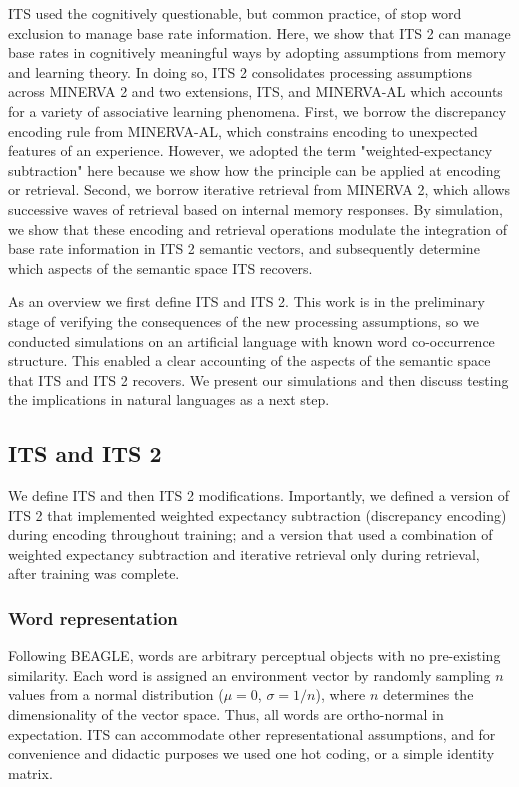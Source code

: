 \documentclass[10pt,letterpaper]{article}
\begin{document}
ITS used the cognitively questionable, but common practice, of stop word exclusion to manage base rate information. Here, we show that ITS 2 can manage base rates in cognitively meaningful ways by adopting assumptions from memory and learning theory. In doing so, ITS 2 consolidates processing assumptions across MINERVA 2 and two extensions, ITS, and MINERVA-AL \cite{jamiesonInstanceTheoryAssociative2012} which accounts for a variety of associative learning phenomena. First, we borrow the discrepancy encoding rule from MINERVA-AL, which constrains encoding to unexpected features of an experience. However, we adopted the term "weighted-expectancy subtraction" here because we show how the principle can be applied at encoding or retrieval. Second, we borrow iterative retrieval from MINERVA 2, which allows successive waves of retrieval based on internal memory responses. By simulation, we show that these encoding and retrieval operations modulate the integration of base rate information in ITS 2 semantic vectors, and subsequently determine which aspects of the semantic space ITS recovers.

As an overview we first define ITS and ITS 2. This work is in the preliminary stage of verifying the consequences of the new processing assumptions, so we conducted simulations on an artificial language with known word co-occurrence structure. This enabled a clear accounting of the aspects of the semantic space that ITS and ITS 2 recovers. We present our simulations and then discuss testing the implications in natural languages as a next step.

\subsection{ITS and ITS 2}

We define ITS and then ITS 2 modifications. Importantly, we defined a version of ITS 2 that implemented weighted expectancy subtraction (discrepancy encoding) during encoding throughout training; and a version that used a combination of weighted expectancy subtraction and iterative retrieval only during retrieval, after training was complete.

\subsubsection{Word representation}

Following BEAGLE, words are arbitrary perceptual objects with no pre-existing similarity. Each word is assigned an environment vector by randomly sampling \(n\) values from a normal distribution (\(\mu = 0\), \(\sigma = 1/n\)), where \(n\) determines the dimensionality of the vector space. Thus, all words are ortho-normal in expectation. ITS can accommodate other representational assumptions, and for convenience and didactic purposes we used one hot coding, or a simple identity matrix.
\end{document}
